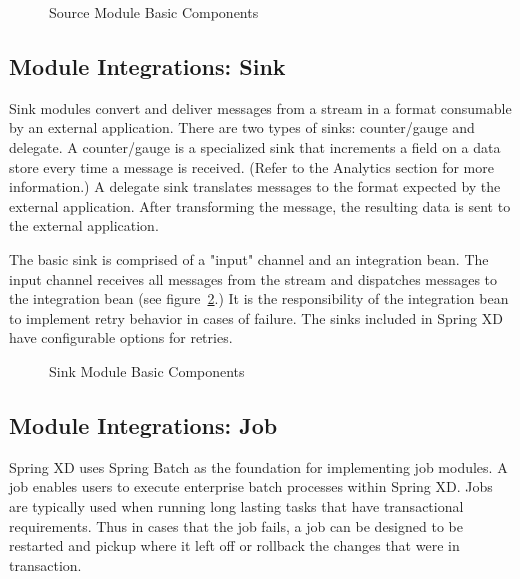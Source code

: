 \par

\begin{figure}[ht]
\centering
{}
\caption{Source Module Basic Components}
\label{fig:sourcembc}
\end{figure}

\subsection{Module Integrations: Sink}
Sink modules convert and deliver messages from a stream in a format consumable by an external application.
There are two types of sinks: counter/gauge and delegate.
A counter/gauge is a specialized sink that increments a field on a data store every time a
message is received. (Refer to the Analytics section for more information.)  A delegate
sink translates messages to the format expected by the external application.
After transforming the message, the resulting data is sent to the external application.

\par

The basic sink is comprised of a "input" channel and an integration bean.
The input channel receives all messages from the stream and dispatches
messages to the integration bean (see figure~\ref{fig:sinkmbc}.) It is the responsibility of
the integration bean to implement retry behavior in cases of failure. The sinks included
in Spring XD have configurable options for retries.

\par

\begin{figure}
\centering
{}
\caption{Sink Module Basic Components}
\label{fig:sinkmbc}
\end{figure}

\subsection{Module Integrations: Job}
Spring XD uses Spring Batch \cite{spring-batch-reference} as the foundation for implementing
job modules. A job enables users to execute enterprise batch processes within Spring XD.
Jobs are typically used when running long lasting tasks that have transactional requirements.
Thus in cases that the job fails, a job can be designed to be restarted and
pickup where it left off or rollback the changes that were in transaction.

